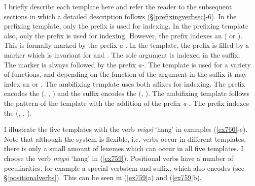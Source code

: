 I briefly describe each template here and refer the reader to the subsequent sections in which a detailed description follows (\S{}\ref{prefixingverbsec}-6). In the prefixing template, only the  prefix is used for  indexing. In the  prefixing template also, only the  prefix is used for  indexing. However, the  prefix indexes an  ( or ). This is formally marked by the  prefix \emph{a-}. In the  template, the prefix is filled by a  marker which is invariant for  and . The sole argument is indexed in the suffix. The  marker is always followed by the  prefix \emph{a-}. The  template is used for a variety of functions, and depending on the function of the argument in the suffix it may index an  or . The ambifixing  template uses both affixes for  indexing. The prefix encodes the  (, , ) and the suffix encodes the  (, ). The  ambifixing template follows the pattern of the  template with the addition of the  prefix \emph{a-}. The  prefix indexes the  (, , ).%

I illustrate the five templates with the verb \emph{migsi} `hang' in examples (\ref{ex760}-e). Note that although the system is flexible, i.e. verbs occur in different templates, there is only a small amount of  lexemes which can occur in all five templates. I choose the  verb \emph{migsi} `hang' in (\ref{ex759}). Positional verbs have a number of peculiarities, for example a special verbstem and  suffix, which also encodes  (see \S\ref{positionalverbs}). This can be seen in (\ref{ex759}a) and  (\ref{ex759}b).

